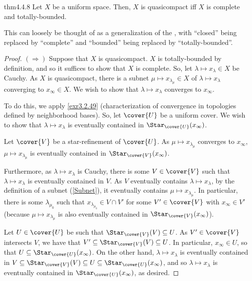 \begin{thm}{}{thm4.4.8}
Let $X$ be a uniform space.  Then, $X$ is quasicompact iff $X$ is complete and totally-bounded.
\begin{rmk}
This can loosely be thought of as a generalization of the , with ``closed'' being replaced by ``complete'' and ``bounded'' being replaced by ``totally-bounded''.
\end{rmk}
\begin{proof}
$(\Rightarrow )$ Suppose that $X$ is quasicompact.  $X$ is totally-bounded by definition, and so it suffices to show that $X$ is complete.  So, let $\lambda \mapsto x_{\lambda}\in X$ be Cauchy.  As $X$ is quasicompact, there is a subnet $\mu \mapsto x_{\lambda _{\mu}}\in X$ of $\lambda \mapsto x_{\lambda}$ converging to $x_{\infty}\in X$.  We wish to show that $\lambda \mapsto x_{\lambda}$ converges to $x_{\infty}$.

To do this, we apply \cref{exr3.2.49} (characterization of convergence in topologies defined by neighborhood bases).  So, let $\cover{U}$ be a uniform cover.  We wish to show that $\lambda \mapsto x_{\lambda}$ is eventually contained in $\Star _{\cover{U}}(x_{\infty})$.

Let $\cover{V}$ be a star-refinement of $\cover{U}$.  As $\mu \mapsto x_{\lambda _{\mu}}$ converges to $x_{\infty}$, $\mu \mapsto x_{\lambda _{\mu}}$ is eventually contained in $\Star _{\cover{V}}(x_{\infty})$.

Furthermore, as $\lambda \mapsto x_{\lambda}$ is Cauchy, there is some $V\in \cover{V}$ such that $\lambda \mapsto x_{\lambda}$ is eventually contained in $V$.  As $V$ eventually contains $\lambda \mapsto x_{\lambda}$, by the definition of a subnet (\cref{Subnet}), it eventually contains $\mu \mapsto x_{\lambda _{\mu}}$.  In particular, there is some $\lambda _{\mu _0}$ such that $x_{\lambda _{\mu _0}}\in V\cap V'$ for some $V'\in \cover{V}$ with $x_{\infty}\in V'$ (because $\mu \mapsto x_{\lambda _{\mu}}$ is also eventually contained in $\Star _{\cover{V}}(x_{\infty})$).

Let $U\in \cover{U}$ be such that $\Star _{\cover{V}}(V)\subseteq U$.  As $V'\in \cover{V}$ intersects $V$, we have that $V'\subseteq \Star _{\cover{V}}(V)\subseteq U$.  In particular, $x_{\infty}\in U$, so that $U\subseteq \Star _{\cover{U}}(x_{\infty})$.  On the other hand, $\lambda \mapsto x_{\lambda}$ is eventually contained in $V\subseteq \Star _{\cover{V}}(V)\subseteq U\subseteq \Star _{\cover{U}}(x_{\infty})$, and so $\lambda \mapsto x_{\lambda}$ is eventually contained in $\Star _{\cover{U}}(x_{\infty})$, as desired.


\end{proof}
\end{thm}
